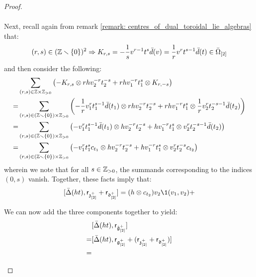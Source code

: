 \begin{proof}
\begin{enumerate}
$$\begin{aligned}
                                \end{aligned}
                            $$
                        Next, recall again from remark \ref{remark: centres_of_dual_toroidal_lie_algebras} that:
                            $$(r, s) \in (\mathbb{Z} \smallsetminus \{0\})^2 \Rightarrow K_{r, s} = -\frac1s v^{r - 1} t^s \bar{d}(v) = \frac1r v^r t^{s - 1} \bar{d}(t) \in \bar{\Omega}_{[2]}$$
                        and then consider the following:
                            $$
                                \begin{aligned}
                                    & \sum_{(r, s) \in \Z \x \Z_{> 0}} \left( -K_{r, s} \tensor r h v_2^{-r} t_2^{-s} + r h v_1^{-r} t_1^s \tensor K_{r, -s} \right)
                                    \\
                                    = & \sum_{(r, s) \in (\Z \setminus \{0\}) \x \Z_{> 0}} \left( -\frac1r v_1^r t_1^{s - 1} \bar{d}(t_1) \tensor r h v_2^{-r} t_2^{-s} + r h v_1^{-r} t_1^s \tensor \frac1r v_2^r t_2^{-s - 1} \bar{d}(t_2) \right)
                                    \\
                                    = & \sum_{(r, s) \in (\Z \setminus \{0\}) \x \Z_{> 0}} \left( -v_1^r t_1^{s - 1} \bar{d}(t_1) \tensor h v_2^{-r} t_2^{-s} + h v_1^{-r} t_1^s \tensor v_2^r t_2^{-s - 1} \bar{d}(t_2) \right)
                                    \\
                                    = & \sum_{(r, s) \in (\Z \setminus \{0\}) \x \Z_{> 0}} \left( -v_1^r t_1^s c_{t_1} \tensor h v_2^{-r} t_2^{-s} + h v_1^{-r} t_1^s \tensor v_2^r t_2^{-s} c_{t_2} \right)
                                \end{aligned}
                            $$
                        wherein we note that for all $s \in \mathbb{Z}_{> 0}$, the summands corresponding to the indices $(0, s)$ vanish. Together, these facts imply that:
                            $$[\bar{\Delta}(ht), \sfr_{\z_{[2]}^+} + \sfr_{\d_{[2]}^+}] = (h \tensor c_{t_2}) v_2 \1(v_1, v_2) + $$

                        We can now add the three components together to yield:
                            $$
                                \begin{aligned}
                                    & [\bar{\Delta}(ht), \mathsf{r}_{\hat{\mathfrak{g}}_{[2]}^+}]
                                    \\
                                    = & [ \bar{\Delta}(ht), \mathsf{r}_{\mathfrak{g}_{[2]}^+} + (\mathsf{r}_{\mathfrak{z}_{[2]}^+} + \mathsf{r}_{\mathfrak{d}_{[2]}^+}) ]
                                    \\
                                    = &
                                \end{aligned}
                            $$
                        

\end{enumerate}
\end{proof}

